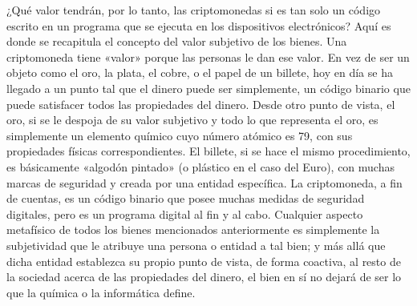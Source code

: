 \documentclass[12pt,a4paper,twoside]{book}
\begin{document}
¿Qué valor tendrán, por lo tanto, las criptomonedas si es tan solo un código escrito en un programa que se ejecuta en los dispositivos electrónicos? Aquí es donde se recapitula el concepto del valor subjetivo de los bienes. Una criptomoneda tiene «valor» porque las personas le dan ese valor. En vez de ser un objeto como el oro, la plata, el cobre, o el papel de un billete, hoy en día se ha llegado a un punto tal que el dinero puede ser simplemente, un código binario que puede satisfacer todos las propiedades del dinero. Desde otro punto de vista, el oro, si se le despoja de su valor subjetivo y todo lo que representa el oro, es simplemente un elemento químico cuyo número atómico es 79, con sus propiedades físicas correspondientes. El billete, si se hace el mismo procedimiento, es básicamente «algodón pintado» (o plástico en el caso del Euro), con muchas marcas de seguridad y creada por una entidad específica. La criptomoneda, a fin de cuentas, es un código binario que posee muchas medidas de seguridad digitales, pero es un programa digital al fin y al cabo. Cualquier aspecto metafísico de todos los bienes mencionados anteriormente es simplemente la subjetividad que le atribuye una persona o entidad a tal bien; y más allá que dicha entidad establezca su propio punto de vista, de forma coactiva, al resto de la sociedad acerca de las propiedades del dinero, el bien en sí no dejará de ser lo que la química o la informática define.
\end{document}
